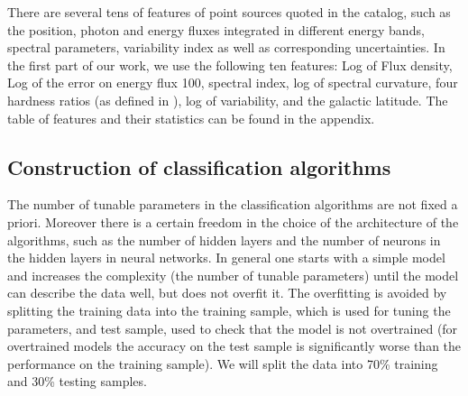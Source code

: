 There are several tens of features of point sources quoted in the catalog, such as the position, photon and energy fluxes integrated in different energy bands, spectral parameters, variability index as well as corresponding uncertainties.
In the first part of our work, we use the following ten features:
Log of Flux density, Log of the error on energy flux 100, spectral index, log of spectral curvature, four hardness ratios (as defined in \cite{2016ApJ...820....8S}), log of variability, and the galactic latitude. 
The table of features and their statistics can be found in the appendix.

\subsection{Construction of classification algorithms}

The number of tunable parameters in the classification algorithms are not fixed a priori. 
Moreover there is a certain freedom in the choice of the architecture of the algorithms, such as
the number of hidden layers and the number of neurons in the hidden layers in neural networks.
In general one starts with a simple model and increases the complexity (the number of tunable parameters)
until the model can describe the data well, but does not overfit it.
The overfitting is avoided by splitting the training data into the training sample, which is used for tuning the parameters,
and test sample, used to check that the model is not overtrained (for overtrained models the accuracy on the test
sample is significantly worse than the performance on the training sample).
We will split the data into 70\% training and 30\% testing samples.

